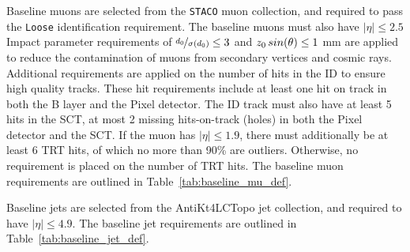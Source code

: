 Baseline muons are selected from the \texttt{STACO} muon collection, and
required to pass the \texttt{Loose} identification requirement. The baseline
muons must also have $|\eta| \leq 2.5$ 
Impact parameter requirements of $\nicefrac{d_0}{\sigma(d_0)} \leq 3$ and
$z_0\,sin(\theta) \leq 1$ mm are applied to reduce the contamination of muons
from secondary vertices and cosmic rays.
Additional requirements are applied on the number of hits in the ID to ensure
high quality tracks.
These  hit requirements include at least one hit on track in both the B layer
and the Pixel detector.
The ID track must also have at least 5 hits in the SCT, at most 2 missing 
hits-on-track (holes) in both the Pixel detector and the SCT. 
If the muon has $|\eta| \leq 1.9$, there must additionally be at least 6 TRT
hits, of which no more than 90\% are outliers.
Otherwise, no requirement is placed on the number of TRT hits.
The baseline muon requirements are outlined in Table~\ref{tab:baseline_mu_def}.

\begin{table}[ht]
  \caption{Baseline muon requirements.}
  \label{tab:baseline_mu_def}
\end{table}

Baseline jets are selected from the AntiKt4LCTopo jet collection, and required
to have $|\eta| \leq 4.9$.
The baseline jet requirements are outlined in Table~\ref{tab:baseline_jet_def}.

